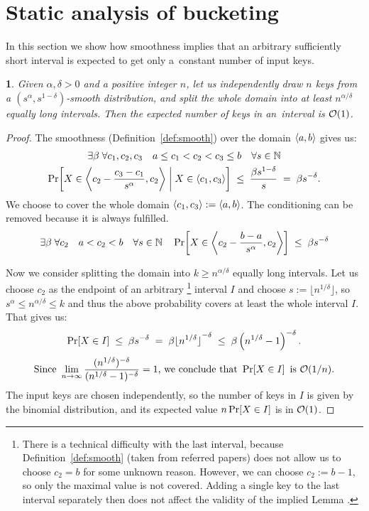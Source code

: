 \documentclass[twoside,english,preprint]{elsarticle}
\theoremstyle{plain}
\theoremstyle{definition}
\theoremstyle{remark}
\theoremstyle{plain}
\newtheorem*{lem*}{\protect\lemmaname}
\theoremstyle{plain}
\newcounter{lemma}
\providecommand{\lemmaname}{Lemma}
\begin{document}

\section{Static analysis of bucketing}
 \label{sec:smooth-bucket}
In this section we show how smoothness implies that an arbitrary sufficiently
short interval is expected to get only a~constant number of input keys.
\begin{lem*}
\label{lem:smooth-bucket}
Given $\alpha,\delta>0$ and a positive
integer $n$, let us independently draw $n$ keys from a $\left(s^{\alpha},s^{1-\delta}\right)$-smooth
distribution, and split the whole domain into at least $n^{\alpha/\delta}$
equally long intervals. Then the expected number of keys in an~interval
is $\mathcal O(1)$.
\end{lem*}

\begin{proof}

The smoothness (Definition~\ref{def:smooth}) over the domain $\left\langle a,b\right\rangle$ gives us:
\begin{multline*}
	\exists\beta \; \forall c_1,c_2,c_3 \quad a \le c_1 < c_2 < c_3 \le b \quad \forall s \in \mathbb{N} \\
		\Pr\!\left[  X \in \left\langle c_2 - \frac{c_3-c_1}{s^\alpha} ,c_2\right\rangle \; \middle| \; X \in \left\langle c_1,c_3\right\rangle  \right]
		\;\le\; \frac{\beta s^{1-\delta}}{s}  \;=\;  \beta s^{-\delta}.
\end{multline*}
We choose to cover the whole domain $\left\langle c_1,c_3\right\rangle := \left\langle a,b\right\rangle$. The conditioning can be removed because it is always fulfilled.
\[
	\exists\beta \; \forall c_2 \quad a < c_2 < b \quad \forall s \in \mathbb{N} \quad
		\Pr\!\left[  X \in \left\langle c_2 - \frac{b-a}{s^\alpha} ,c_2\right\rangle  \right]
		\;\le\; \beta s^{-\delta}
\]

Now we consider splitting the domain into $k \ge n^{\alpha / \delta}$ equally long intervals.
Let us choose $c_2$ as the endpoint of an arbitrary%
	\footnote{There is a technical difficulty with the last interval, because Definition~\ref{def:smooth} (taken from referred papers) does not allow us to choose $c_2 = b$ for some unknown reason.
	However, we can choose $c_2 := b-1$, so only the maximal value is not covered. Adding a single key to the last interval separately then does not affect the validity of the implied Lemma%
	.
	}
interval $I$ and choose $s:= \lfloor n^{1 / \delta} \rfloor$, so
$ s^\alpha \le n^{\alpha / \delta} \le k $ and thus the above probability covers at least the whole interval $I$. That gives us:
\[	\Pr\!\left[X \in I\right] \;\le\; \beta s^{-\delta}
	\;=\; \beta {\lfloor n^{1 / \delta} \rfloor}^{-\delta}
	\;\le\; \beta \left( n^{1 / \delta} - 1 \right) ^{-\delta}.
\] \[
\text{Since } \lim_{n \to \infty}
	\frac{ ( n^{1 / \delta} ) ^{-\delta} }{ ( n^{1 / \delta} - 1 ) ^{-\delta} }
	= 1 \text{, we conclude that } \Pr\!\left[X \in I\right] \text{ is } \mathcal O(1/n).
\]
%
The input keys are chosen independently, so the number of keys in $I$ is given by the binomial distribution, and its expected value
$n \Pr\!\left[X \in I\right]$ is in $\mathcal O(1)$.
\end{proof}
\end{document}
